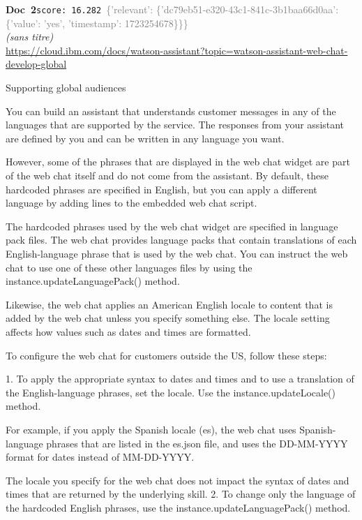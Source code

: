 \documentclass[a4paper,11pt]{article}
\begin{document}
\begin{docenv}
{\footnotesize\textcolor{doccolor}{\textbf{Doc~2}}}\hfill{\tiny\texttt{score:~16.282}}\ {\tiny\textcolor{gray}{\{'relevant': \{'dc79eb51-e320-43c1-841c-3b1baa66d0aa': \{'value': 'yes', 'timestamp': 1723254678\}\}\}}}\\[3pt]
{\small\textit{(sans titre)}}\\[2pt]
{\tiny\url{https://cloud.ibm.com/docs/watson-assistant?topic=watson-assistant-web-chat-develop-global}}\\[4pt]
{\footnotesize 






  Supporting global audiences 

You can build an assistant that understands customer messages in any of the languages that are supported by the service. The responses from your assistant are defined by you and can be written in any language you want.

However, some of the phrases that are displayed in the web chat widget are part of the web chat itself and do not come from the assistant. By default, these hardcoded phrases are specified in English, but you can apply a different language by adding lines to the embedded web chat script.

The hardcoded phrases used by the web chat widget are specified in language pack files. The web chat provides language packs that contain translations of each English-language phrase that is used by the web chat. You can instruct the web chat to use one of these other languages files by using the instance.updateLanguagePack() method.

Likewise, the web chat applies an American English locale to content that is added by the web chat unless you specify something else. The locale setting affects how values such as dates and times are formatted.

To configure the web chat for customers outside the US, follow these steps:



1.  To apply the appropriate syntax to dates and times and to use a translation of the English-language phrases, set the locale. Use the instance.updateLocale() method.

For example, if you apply the Spanish locale (es), the web chat uses Spanish-language phrases that are listed in the es.json file, and uses the DD-MM-YYYY format for dates instead of MM-DD-YYYY.

The locale you specify for the web chat does not impact the syntax of dates and times that are returned by the underlying skill.
2.  To change only the language of the hardcoded English phrases, use the instance.updateLanguagePack() method.

}
\end{docenv}
\end{document}
